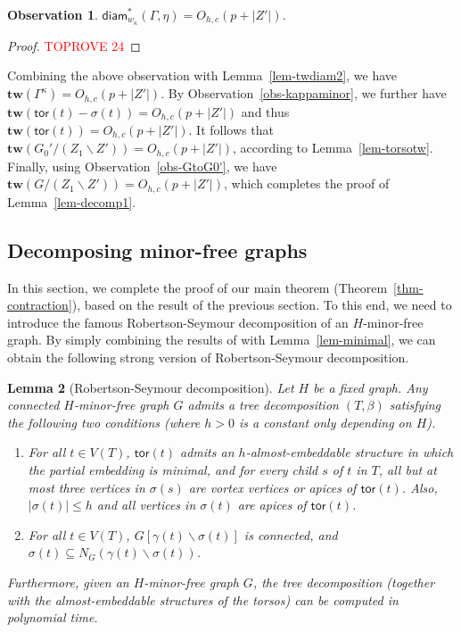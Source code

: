 \documentclass[a4paper,11pt]{article}
\newtheorem{lemma}{Lemma}
\numberwithin{lemma}{section}
\newtheorem{observation}[lemma]{Observation}
\newcommand{\tw}{\mathbf{tw}}
\newcommand{\tor}{\mathsf{tor}}
\begin{document}
\begin{observation}
$\mathsf{diam}_{w_\kappa}^*(\varGamma,\eta) = O_{h,c}(p+|Z'|)$.
\end{observation}
\begin{proof}\textcolor{red}{TOPROVE 24}\end{proof}

Combining the above observation with Lemma~\ref{lem-twdiam2}, we have $\tw(\varGamma^\kappa) = O_{h,c}(p+|Z'|)$.
By Observation~\ref{obs-kappaminor}, we further have $\tw(\tor(t) - \sigma(t)) = O_{h,c}(p+|Z'|)$ and thus $\tw(\tor(t)) = O_{h,c}(p+|Z'|)$.
It follows that $\tw(G_0'/(Z_1 \backslash Z')) = O_{h,c}(p+|Z'|)$, according to Lemma~\ref{lem-torsotw}.
Finally, using Observation~\ref{obs-GtoG0'}, we have $\tw(G/(Z_1 \backslash Z')) = O_{h,c}(p+|Z'|)$, which completes the proof of Lemma~\ref{lem-decomp1}.
 
\subsection{Decomposing minor-free graphs}
In this section, we complete the proof of our main theorem (Theorem~\ref{thm-contraction}), based on the result of the previous section.
To this end, we need to introduce the famous Robertson-Seymour decomposition of an $H$-minor-free graph.
By simply combining the results of \cite{BandyapadhyayLLSJ22,DemaineHK05} with Lemma~\ref{lem-minimal}, we can obtain the following strong version of Robertson-Seymour decomposition.

\begin{lemma}[Robertson-Seymour decomposition] \label{lem-rsdecomp}
Let $H$ be a fixed graph.
Any connected $H$-minor-free graph $G$ admits a tree decomposition $(T,\beta)$ satisfying the following two conditions (where $h>0$ is a constant only depending on $H$).
\begin{enumerate}[label = (RS.\arabic*)]
    \item\label{item:rs-decomposition-1} For all $t \in V(T)$, $\tor(t)$ admits an $h$-almost-embeddable structure in which the partial embedding is minimal, and for every child $s$ of $t$ in $T$, all but at most three vertices in $\sigma(s)$ are vortex vertices or apices of $\tor(t)$.
    Also, $|\sigma(t)| \leq h$ and all vertices in $\sigma(t)$ are apices of $\tor(t)$.
    \item\label{item:rs-decomposition-2} For all $t \in V(T)$, $G[\gamma(t) \backslash \sigma(t)]$ is connected, and $\sigma(t) \subseteq N_G(\gamma(t) \backslash \sigma(t))$.
\end{enumerate}
Furthermore, given an $H$-minor-free graph $G$, the tree decomposition (together with the almost-embeddable structures of the torsos) can be computed in polynomial time.
\end{lemma}
\end{document}
